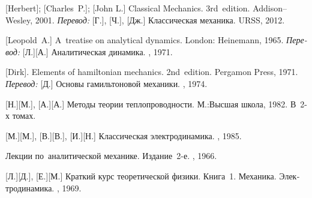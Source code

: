 \begin{thebibliography}{123}
\begin{otherlanguage}{russian}
%

[Herbert]; [Charles~P.]; [John L.] Classical Mechanics. 3rd~edition. Addison\hbox{--}Wesley, 2001. 
\emph{Перевод:} [Г.], [Ч.], [Дж.] Классическая механика. URSS, 2012. 


[Leopold~A.] A~treatise on analytical dynamics.
London: Heinemann, 1965. 
\emph{Перевод:} [Л.][А.] Аналитическая динамика. \naukapublisher, 1971. 

[Dirk]. Elements of hamiltonian mechanics. 2nd~edition. Pergamon Press, 1971. 
\emph{Перевод:} [Д.] Основы гамильтоновой механики. \naukapublisher, 1974. 

[Н.][М.], [А.][А.] Методы теории теплопроводности. М.:\;Высшая школа, 1982. В~2\hbox{-}х томах.

[М.][М.], [В.][В.], [И.][Н.] Классическая электродинамика. \naukapublisher, 1985. 

Лекции по~аналитической механике.
Издание~2\hbox{-}е.
\naukapublisher, 1966.

[Л.][Д.], [Е.][М.] Краткий курс теоретической физики. Книга~1. Механика. Электродинамика. \naukapublisher, 1969. 


\end{otherlanguage}
\end{thebibliography}
